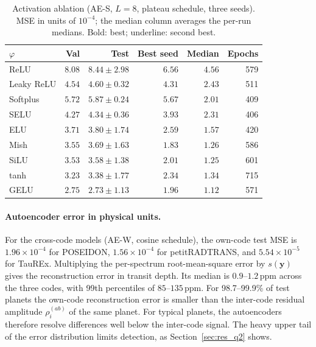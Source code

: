 \begin{table}[t]
  \centering
  \caption{Activation ablation (AE-S, $L=8$, plateau schedule, three seeds). MSE in units of $10^{-4}$; the median column averages the per-run medians. Bold: best; underline: second best.}
  \label{tab:act}
  \begin{tabular}{lrrrrr}
    \toprule
    $\varphi$ & Val & Test & Best seed & Median & Epochs \\
    \midrule
    ReLU        & $8.08$ & $8.44\pm2.98$ & $6.56$ & $4.56$ & 579 \\
    Leaky ReLU  & $4.54$ & $4.60\pm0.32$ & $4.31$ & $2.43$ & 511 \\
    Softplus    & $5.72$ & $5.87\pm0.24$ & $5.67$ & $2.01$ & 409 \\
    SELU        & $4.27$ & $4.34\pm0.36$ & $3.93$ & $2.31$ & 406 \\
    ELU         & $3.71$ & $3.80\pm1.74$ & $2.59$ & $1.57$ & 420 \\
    Mish        & $3.55$ & $3.69\pm1.63$ & $\mathbf{1.83}$ & $1.26$ & 586 \\
    SiLU        & $3.53$ & $3.58\pm1.38$ & $2.01$ & \underline{$1.25$} & 601 \\
    tanh        & \underline{$3.23$} & \underline{$3.38\pm1.77$} & $2.34$ & $1.34$ & 715 \\
    GELU        & $\mathbf{2.75}$ & $\mathbf{2.73\pm1.13}$ & \underline{$1.96$} & $\mathbf{1.12}$ & 571 \\
    \bottomrule
  \end{tabular}
\end{table}

\paragraph{Autoencoder error in physical units.}
For the cross-code models (AE-W, cosine schedule), the own-code test MSE is $1.96\times10^{-4}$ for POSEIDON, $1.56\times10^{-4}$ for petitRADTRANS, and $5.54\times10^{-5}$ for TauREx.
Multiplying the per-spectrum root-mean-square error by $s(\mathbf{y})$ gives the reconstruction error in transit depth.
Its median is $0.9$--$1.2\,\mathrm{ppm}$ across the three codes, with 99th percentiles of $85$--$135\,\mathrm{ppm}$.
For 98.7--99.9\% of test planets the own-code reconstruction error is smaller than the inter-code residual amplitude $\rho_i^{(ab)}$ of the same planet.
For typical planets, the autoencoders therefore resolve differences well below the inter-code signal.
The heavy upper tail of the error distribution limits detection, as Section~\ref{sec:res_q2} shows.

